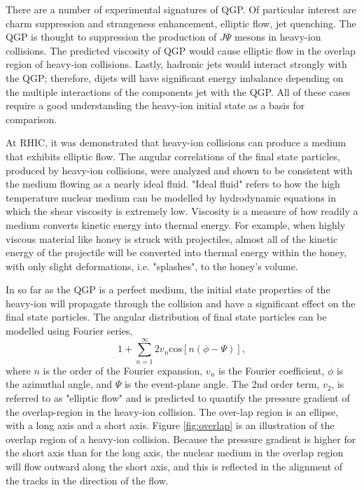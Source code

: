 There are a number of experimental signatures of QGP. Of particular interest are charm suppression and strangeness enhancement, elliptic flow, jet quenching. The QGP is thought to suppression the production of $J\Psi$ mesons in heavy-ion collisions. The predicted viscosity of QGP would cause elliptic flow in the overlap region of heavy-ion collisions. Lastly, hadronic jets would interact strongly with the QGP; therefore, dijets will have significant energy imbalance depending on the multiple interactions of the components jet with the QGP. All of these cases require a good understanding the heavy-ion initial state as a basis for comparison. 

At RHIC, it was demonstrated that heavy-ion collisions can produce a medium that exhibits elliptic flow. The angular correlations of the final state particles, produced by heavy-ion collisions, were analyzed and shown to be consistent with the medium flowing as a nearly ideal fluid. "Ideal fluid" refers to how the high temperature nuclear medium can be modelled by hydrodynamic equations in which the shear viscosity is extremely low. Viscosity is a measure of how readily a medium converts kinetic energy into thermal energy. For example, when highly viscous material like honey is struck with projectiles, almost all of the kinetic energy of the projectile will be converted into thermal energy within the honey, with only slight deformations, i.e. "splashes", to the honey's volume. 

In so far as the QGP is a perfect medium, the initial state properties of the heavy-ion will propagate through the collision and have a significant effect on the final state particles. The angular distribution of final state particles can be modelled using Fourier series,
\begin{equation}
 1+\sum^{\infty}_{n=1}2v_{n}\mathrm{cos}\left[n\left(\phi-\Psi\right)\right],
\end{equation}
where $n$ is the order of the Fourier expansion, $v_n$ is the Fourier coefficient, $\phi$ is the azimuthal angle, and $\Psi$ is the event-plane angle. The 2nd order term, $v_2$, is referred to as "elliptic flow" and is predicted to quantify the pressure gradient of the overlap-region in the heavy-ion collision. The over-lap region is an ellipse, with a long axis and a short axis. Figure \ref{fig:overlap} is an illustration of the overlap region of a heavy-ion collision. Because the pressure gradient is higher for the short axis than for the long axis, the nuclear medium in the overlap region will flow outward along the short axis, and this is reflected in the alignment of the tracks in the direction of the flow. 

